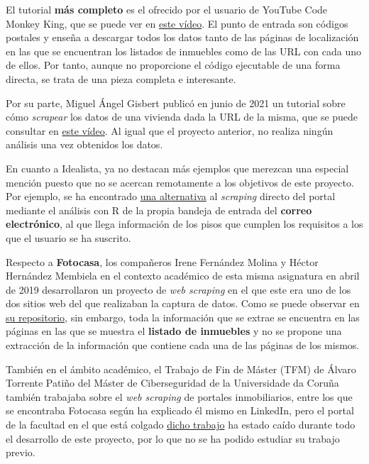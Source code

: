 \documentclass[12pt]{article}
\begin{document}
El tutorial \textbf{más completo} es el ofrecido por el usuario de YouTube Code Monkey King, que se puede ver en \href{https://www.youtube.com/watch?v=4Tv73KuqgVo}{este vídeo}. El punto de entrada son códigos postales y enseña a descargar todos los datos tanto de las páginas de localización en las que se encuentran los listados de inmuebles como de las URL con cada uno de ellos. Por tanto, aunque no proporcione el código ejecutable de una forma directa, se trata de una pieza completa e interesante. 

Por su parte, Miguel Ángel Gisbert publicó en junio de 2021 un tutorial sobre cómo \textit{scrapear} los datos de una vivienda dada la URL de la misma, que se puede consultar en \href{https://www.youtube.com/watch?v=2UyJv5oe570}{este vídeo}. Al igual que el proyecto anterior, no realiza ningún análisis una vez obtenidos los datos. 

En cuanto a Idealista, ya no destacan más ejemplos que merezcan una especial mención puesto que no se acercan remotamente a los objetivos de este proyecto. Por ejemplo, se ha encontrado \href{https://medium.com/@rubenmarcos/crear-una-base-de-datos-de-la-evoluci%C3%B3n-del-mercado-inmobiliario-con-idealista-y-r-y-sin-scraping-1d5025a9d47e}{una alternativa} al \textit{scraping} directo del portal mediante el análisis con R de la propia bandeja de entrada del \textbf{correo electrónico}, al que llega información de los pisos que cumplen los requisitos a los que el usuario se ha suscrito.

Respecto a \textbf{Fotocasa}, los compañeros Irene Fernández Molina y Héctor Hernández Membiela en el contexto académico de esta misma asignatura en abril de 2019 desarrollaron un proyecto de \textit{web scraping} en el que este era uno de los dos sitios web del que realizaban la captura de datos. Como se puede observar en \href{https://github.com/EdelBlau/PEC_TPC}{su repositorio}, sin embargo, toda la información que se extrae se encuentra en las páginas en las que se muestra el \textbf{listado de inmuebles} y no se propone una extracción de la información que contiene cada una de las páginas de los mismos. 

También en el ámbito académico, el Trabajo de Fin de Máster (TFM) de Álvaro Torrente Patiño del Máster de Ciberseguridad de la Universidade da Coruña también trabajaba sobre el \textit{web scraping} de portales inmobiliarios, entre los que se encontraba Fotocasa según ha explicado él mismo en LinkedIn, pero el portal de la facultad en el que está colgado \href{http://castor.det.uvigo.es:8080/xmlui/bitstream/handle/123456789/575/TorrentePatino_Alvaro_TFM_2021.pdf?sequence=1&isAllowed=y}{dicho trabajo} ha estado caído durante todo el desarrollo de este proyecto, por lo que no se ha podido estudiar su trabajo previo. 
\end{document}
